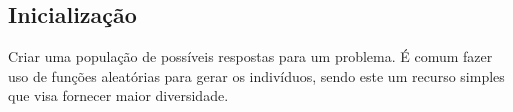 \begin{minipage}{\linewidth}
	\label{fig:EstruturaAG}
\end{minipage}


\subsection{Inicialização}
Criar uma população de possíveis respostas para um problema. 
É comum fazer uso de funções aleatórias para gerar os indivíduos, sendo este um recurso simples que visa fornecer maior diversidade.


